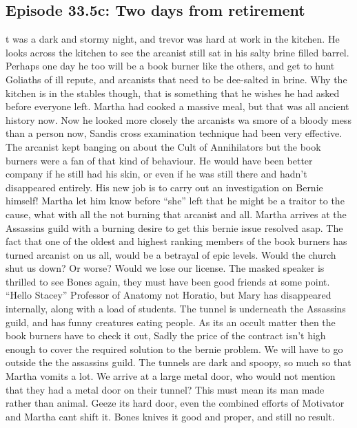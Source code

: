 \subsection{Episode 33.5c: Two days from retirement}\medskip
{}t was a dark and stormy night, and trevor was hard at work in the kitchen. He looks across the kitchen to see the arcanist still sat in his salty brine filled barrel.\medskip
Perhaps one day he too will be a book burner like the others, and get to hunt Goliaths of ill repute, and arcanists that need to be dee-salted in brine. Why the kitchen is in the stables though, that is something that he wishes he had asked before everyone left. Martha had cooked a massive meal, but that was all ancient history now.\medskip
Now he looked more closely the arcanists wa smore of a bloody mess than a person now, Sandis cross examination technique had been very effective. The arcanist kept banging on about the Cult of Annihilators but the book burners were a fan of that kind of behaviour. He would have been better company if he still had his skin, or even if he was still there and hadn’t disappeared entirely.\medskip
His new job is to carry out an investigation on Bernie himself! Martha let him know before “she” left that he might be a traitor to the cause, what with all the not burning that arcanist and all.\medskip
Martha arrives at the Assassins guild with a burning desire to get this bernie issue resolved asap. The fact that one of the oldest and highest ranking members of the book burners has turned arcanist on us all, would be a betrayal of epic levels. Would the church shut us down? Or worse? Would we lose our license.\medskip
The masked speaker is thrilled to see Bones again, they must have been good friends at some point.\medskip
“Hello Stacey”\medskip
Professor of Anatomy not Horatio, but Mary has disappeared internally, along with a load of students.\medskip
The tunnel is underneath the Assassins guild, and has funny creatures eating people. As its an occult matter then the book burners have to check it out, Sadly the price of the contract isn’t high enough to cover the required solution to the bernie problem. We will have to go outside the the assassins guild.\medskip
The tunnels are dark and spoopy, so much so that Martha vomits a lot. We arrive at a large metal door, who would not mention that they had a metal door on their tunnel? This must mean its man made rather than animal. Geeze its hard door, even the combined efforts of Motivator and Martha cant shift it. Bones knives it good and proper, and still no result.\medskip
